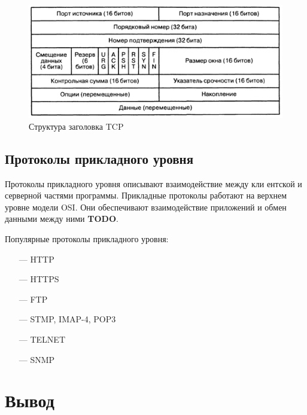 \begin{center}
	\begin{figure}\
		\begin{center}
		\includegraphics[scale=0.6]{img/tcp-struct}
		\end{center}
		\caption{\label{fig:tcp-struct} Структура заголовка TCP}
	\end{figure}
\end{center}

\subsection{Протоколы прикладного уровня}

Протоколы прикладного уровня описывают взаимодействие между кли­ ентской и серверной частями программы. Прикладные протоколы работают на верхнем уровне модели OSI. Они обеспечивают взаимодействие приложений и обмен данными между ними \textbf{TODO}. 

Популярные протоколы прикладного уровня:

\begin{itemize}
	\item[---] HTTP
	\item[---] HTTPS
	\item[---] FTP
	\item[---] STMP, IMAP-4, POP3 
	\item[---] TELNET
	\item[---] SNMP
\end{itemize}


\section*{Вывод}



